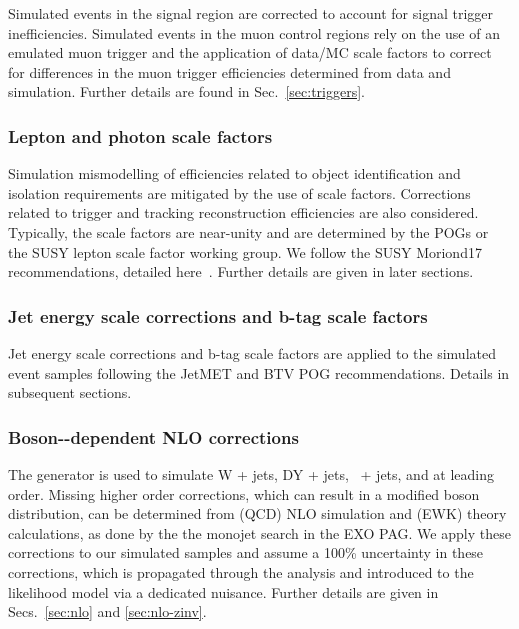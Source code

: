 Simulated events in the signal region are corrected to account for
signal trigger inefficiencies. Simulated events in the muon control
regions rely on the use of an emulated muon trigger and the
application of data/MC scale factors to correct for differences in the
muon trigger efficiencies determined from data and simulation. Further
details are found in Sec.~\ref{sec:triggers}.

\subsubsection{Lepton and photon scale factors}

Simulation mismodelling of efficiencies related to object
identification and isolation requirements are mitigated by the use of
scale factors. Corrections related to trigger and tracking
reconstruction efficiencies are also considered. Typically, the scale
factors are near-unity and are determined by the POGs or the SUSY
lepton scale factor working group. We follow the SUSY Moriond17
recommendations, detailed here~\cite{susymoriond}. Further details are
given in later sections.

\subsubsection{Jet energy scale corrections and b-tag scale factors}
\label{sec:jecs-and-btag-sf}

Jet energy scale corrections and b-tag scale factors are applied to
the simulated event samples following the JetMET and BTV POG
recommendations. Details in subsequent sections. 

\subsubsection{Boson-\texorpdfstring{\Pt}{pT}-dependent NLO corrections}
\label{sec:nlo-intro}

The \MADGRAPH generator is used to simulate W + jets, DY + jets,
\znunu\ + jets, and \gj at leading order. Missing higher order
corrections, which can result in a modified boson \Pt distribution,
can be determined from (QCD) NLO simulation and (EWK) theory
calculations, as done by the the monojet search in the EXO PAG. We
apply these corrections to our simulated samples and assume a 100\%
uncertainty in these corrections, which is propagated through the
analysis and introduced to the likelihood model via a dedicated
nuisance. Further details are given in Secs.~\ref{sec:nlo} and
\ref{sec:nlo-zinv}.

